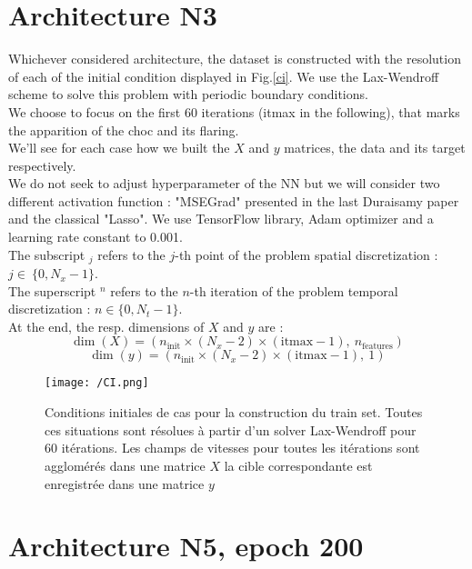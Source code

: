 \documentclass[a4paper,12pt]{report}
\numberwithin{equation}{section} %
\begin{document}
\section*{Architecture N3}
\noindent Whichever considered architecture, the dataset is constructed with the resolution of each of the initial condition displayed in Fig.\eqref{ci}. We use the Lax-Wendroff scheme to solve this problem with periodic boundary conditions.\\
We choose to focus on the first 60 iterations (itmax in the following), that marks the apparition of the choc and its flaring.\\
We'll see for each case how we built the $X$ and $y$ matrices, the data and its target respectively. \\
We do not seek to adjust hyperparameter of the NN but we will consider two different activation function : "MSEGrad" presented in the last Duraisamy paper and the classical "Lasso". We use TensorFlow library, Adam optimizer and a learning rate constant to 0.001.\\
The subscript $_j$ refers to the $j$-th point of the problem spatial discretization : $j \in \ \{ 0, N_x-1 \}$.\\
The superscript $^n$ refers to the $n$-th iteration of the problem temporal discretization : $n \in \{ 0, N_t-1 \}$. \\
At the end, the resp. dimensions of $X$ and $y$ are : 
$$\dim\left(X \right) = \left(n_{\text{init}} \times (N_x - 2) \times (\text{itmax} - 1),\ n_{\text{features}}\right) $$
$$ \dim \left(y \right) = \left(n_{\text{init}} \times (N_x - 2) \times (\text{itmax} - 1), \ 1 \right) $$

\begin{figure}[!ht]
\centering
\texttt{[image: /CI.png]}
\caption{Conditions initiales de cas pour la construction du train set. Toutes ces situations sont résolues à partir d'un solver Lax-Wendroff pour 60 itérations. Les champs de vitesses pour toutes les itérations sont agglomérés dans une matrice $X$ la cible correspondante est enregistrée dans une matrice $y$}
\label{ci}
\end{figure}

\pagebreak

\section*{Architecture N5, epoch 200}
\end{document}
